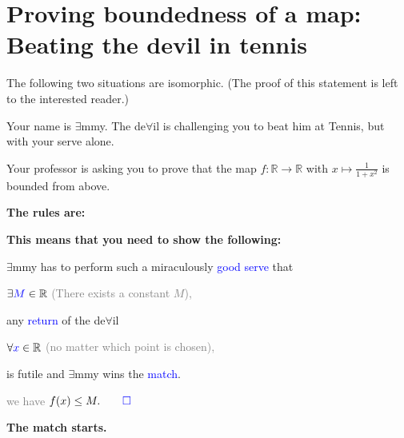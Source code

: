 \documentclass[11pt]{article}
\theoremstyle{plain}
\theoremstyle{definition}
\theoremstyle{remark}
\numberwithin{equation}{section}
\newcommand{\e}{\exists}
\newcommand{\f}{\forall}
\newcommand{\R}{\mathbb{R}}
\begin{document}
\section{Proving boundedness of a map: Beating the devil in tennis}

\label{sec:Tennis}
The following two situations are isomorphic. (The proof of this statement is left to the interested reader.) 
\setlength{\columnseprule}{0.4pt}
\setlength{\columnsep}{2em}
\begin{paracol}{2}
\begin{nthcolumn*}{0}
Your name is $\e$mmy. The de$\f$il is challenging you to beat him at Tennis, but with your serve alone. 
\end{nthcolumn*}     
    \begin{nthcolumn}{1}
    Your professor is asking you to prove that the map $f: \R\to\R$ with $x\mapsto \frac{1}{1+x^2}$ is bounded from above. 
    \end{nthcolumn}
\begin{nthcolumn*}{0}
\textbf{The rules are:}
\end{nthcolumn*}     
    \begin{nthcolumn}{1}
    \textbf{This means that you need to show the following:}
    \end{nthcolumn}
\begin{nthcolumn*}{0}
 $\e$mmy has to perform such a miraculously \textcolor{blue}{good serve} that
\end{nthcolumn*}     
    \begin{nthcolumn}{1}
    $\exists \textcolor{blue}{M}\in \R$ \textcolor{gray}{(There exists a constant $M$),}
    \end{nthcolumn}
\begin{nthcolumn*}{0}
any \textcolor{blue}{return} of the de$\f$il
\end{nthcolumn*}     
    \begin{nthcolumn}{1}
    $\forall {\color{blue}{x}}\in \R$ \textcolor{gray}{(no matter which point is chosen),}
    \end{nthcolumn}
\begin{nthcolumn*}{0}
is futile and  $\e$mmy wins the \textcolor{blue}{match}.
\end{nthcolumn*}     
    \begin{nthcolumn}{1}
    \textcolor{gray}{we have} $f(x) \leq M. \textcolor{blue}{\qed}$ 
    \end{nthcolumn}
\begin{nthcolumn*}{0}
\textbf{The match starts. }
\end{nthcolumn*}     

\end{paracol}
\end{document}
